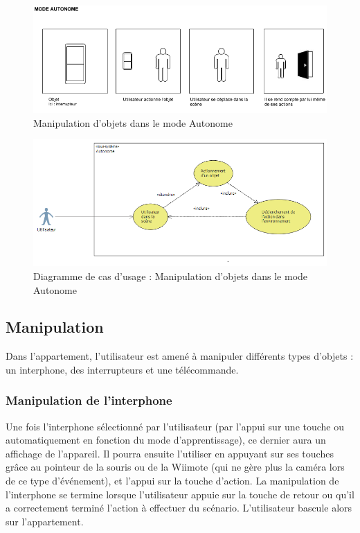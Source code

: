 \begin{figure}[h]
\centering
\includegraphics[width=1\textwidth]{2-Specifications/img-utilisateur/autonome.png}
\caption{\label{fig:MaquetteAutonome} Manipulation d'objets dans le mode Autonome }
\end{figure}
\begin{figure}[h]
\centering
\includegraphics[width=1\textwidth]{2-Specifications/img-utilisateur/cas-usage-autonome.png}
\caption{\label{fig:CasUsageAutonome} Diagramme de cas d'usage : Manipulation d'objets dans le mode Autonome }
\end{figure}
\FloatBarrier

\subsection{Manipulation}
Dans l'appartement, l'utilisateur est amené à manipuler différents types d'objets : un interphone, des interrupteurs et une télécommande.

\subsubsection{Manipulation de l'interphone }
Une fois l'interphone sélectionné par l'utilisateur (par l'appui sur une touche ou automatiquement en fonction du mode d'apprentissage), ce dernier aura un affichage de l'appareil. Il pourra ensuite l'utiliser en appuyant sur ses touches grâce au pointeur de la souris ou de la Wiimote (qui ne gère plus la caméra lors de ce type d'événement), et l'appui sur la touche d'action. La manipulation de l'interphone se termine lorsque l'utilisateur appuie sur la touche de retour ou qu'il a correctement terminé l'action à effectuer du scénario. L'utilisateur bascule alors sur l'appartement.

